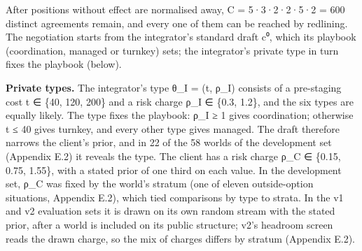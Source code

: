 After positions without effect are normalised away, \textbar C\textbar{} = 5·3·2·2·5·2 = 600 distinct agreements remain, and
every one of them can be reached by redlining. The negotiation starts from the integrator's standard draft c⁰, which
its playbook (coordination, managed or turnkey) sets; the integrator's private type in turn fixes the playbook
(below).

\textbf{Private types.} The integrator's type θ\_I = (t, ρ\_I) consists of a pre-staging cost t ∈ \{40, 120, 200\} and a
risk charge ρ\_I ∈ \{0.3, 1.2\}, and the six types are equally likely. The type fixes the playbook: ρ\_I ≥ 1 gives
coordination; otherwise t ≤ 40 gives turnkey, and every other type gives managed. The draft therefore narrows the
client's prior, and in 22 of the 58 worlds of the development set (Appendix E.2) it reveals the type. The client
has a risk charge ρ\_C ∈ \{0.15, 0.75, 1.55\}, with a stated prior of one third on each value. In the development set,
ρ\_C was fixed by the world's stratum (one of eleven outside-option situations, Appendix E.2), which tied comparisons by
type to strata. In the v1 and v2 evaluation sets it is drawn on its own random stream with the stated prior, after a
world is included on its public structure; v2's headroom screen reads the drawn charge, so the mix of charges differs
by stratum (Appendix E.2).

